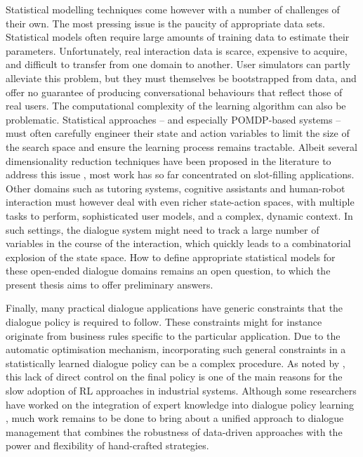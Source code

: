 Statistical modelling techniques come however with a number of challenges of their own. The most pressing issue is the paucity of appropriate data sets.  Statistical models often require large amounts of training data to estimate their parameters. Unfortunately, real interaction data is scarce, expensive to acquire, and difficult to transfer from one domain to another.  User simulators can partly alleviate this problem, but they must themselves be bootstrapped from data, and offer no guarantee of producing conversational behaviours that reflect those of real users.  The computational complexity of the learning algorithm can also be problematic. Statistical approaches -- and especially POMDP-based systems -- must often carefully engineer their state and action variables to limit the size of the search space and ensure the learning process remains tractable.  Albeit several dimensionality reduction techniques have been proposed in the literature to address this issue \citep{williams2005,Young:2010,Cuayahuitl:2010,CrookL11}, most work has so far concentrated on slot-filling applications.   Other domains such as tutoring systems, cognitive assistants and human-robot interaction must however deal with even richer state-action spaces, with multiple tasks to perform, sophisticated user models, and a complex, dynamic context.  In such settings, the dialogue system might need to track a large number of variables in the course of the interaction, which quickly leads to a combinatorial explosion of the state space.  How to define appropriate statistical models for these open-ended dialogue domains remains an open question, to which the present thesis aims to offer preliminary answers. 

Finally, many practical dialogue applications have generic constraints that the dialogue policy is required to follow.  These constraints might for instance originate from business rules specific to the particular application.  Due to the automatic optimisation mechanism, incorporating such general constraints in a statistically learned dialogue policy can be a complex procedure.  As noted by \cite{Paek:2008}, this lack of direct control on the final policy is one of the main reasons for the slow adoption of RL approaches in industrial systems.  Although some researchers have worked on the integration of expert knowledge into dialogue policy learning \citep{williams2008,Henderson:2008}, much work remains to be done to bring about a unified approach to dialogue management that combines the robustness of data-driven approaches with the power and flexibility of hand-crafted strategies. 

